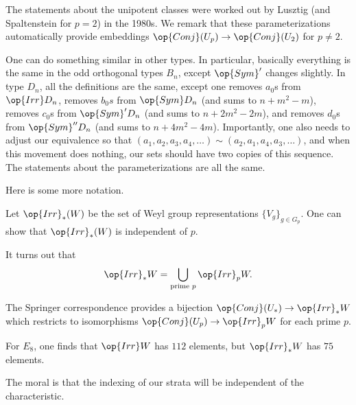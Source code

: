 \documentclass[../notes.tex]{subfiles}
\begin{document}
The statements about the unipotent classes were worked out by Lusztig (and Spaltenstein for $p=2$) in the 1980s. We remark that these parameterizations automatically provide embeddings $\op{Conj}(U_p)\to\op{Conj}(U_2)$ for $p\ne2$.
\begin{remark}
	One can do something similar in other types. In particular, basically everything is the same in the odd orthogonal types $B_n$, except $\op{Sym}'$ changes slightly. In type $D_n$, all the definitions are the same, except one removes $a_0$s from $\op{Irr}D_n$, removes $b_0s$ from $\op{Sym}D_n$ (and sums to $n+m^2-m$), removes $c_0$s from $\op{Sym}'D_n$ (and sums to $n+2m^2-2m$), and removes $d_0$s from $\op{Sym}''D_n$ (and sums to $n+4m^2-4m$). Importantly, one also needs to adjust our equivalence so that $(a_1,a_2,a_3,a_4,\ldots)\sim(a_2,a_1,a_4,a_3,\ldots)$, and when this movement does nothing, our sets should have two copies of this sequence. The statements about the parameterizations are all the same.
\end{remark}
Here is some more notation.
\begin{notation}
	Let $\op{Irr}_*(W)$ be the set of Weyl group representations $\{V_g\}_{g\in G_p}$. One can show that $\op{Irr}_*(W)$ is independent of $p$. %
\end{notation}
\begin{remark}
	It turns out that
	\[\op{Irr}_*W=\bigcup_{\text{prime }p}\op{Irr}_pW.\]
\end{remark}
\begin{remark}
	The Springer correspondence provides a bijection $\op{Conj}(U_*)\to\op{Irr}_*W$ which restricts to isomorphisms $\op{Conj}(U_p)\to\op{Irr}_pW$ for each prime $p$.
\end{remark}
\begin{example}
	For $E_8$, one finds that $\op{Irr}W$ has $112$ elements, but $\op{Irr}_*W$ has $75$ elements.
\end{example}
The moral is that the indexing of our strata will be independent of the characteristic.
\end{document}

